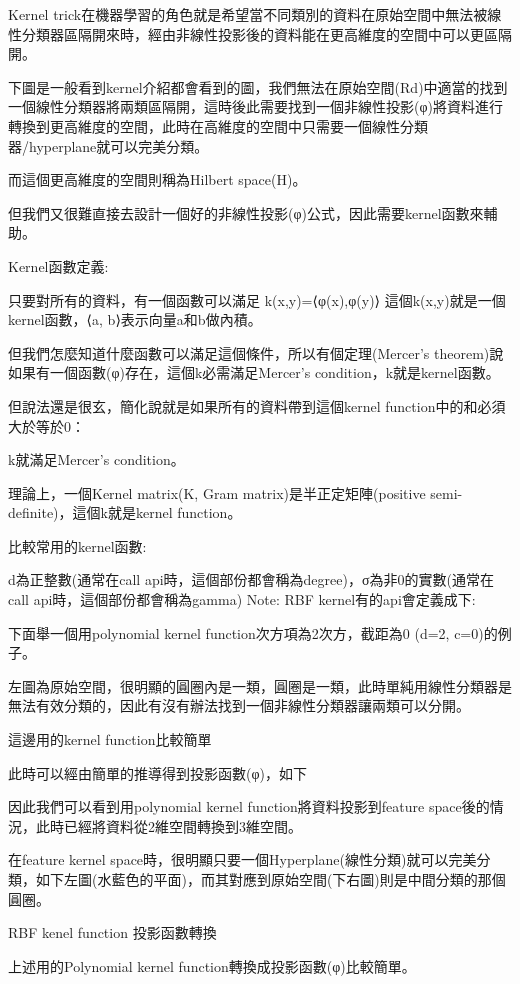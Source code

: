 \documentclass[12pt,a4paper]{amsart}
\begin{document}
Kernel trick在機器學習的角色就是希望當不同類別的資料在原始空間中無法被線性分類器區隔開來時，經由非線性投影後的資料能在更高維度的空間中可以更區隔開。

下圖是一般看到kernel介紹都會看到的圖，我們無法在原始空間(Rd)中適當的找到一個線性分類器將兩類區隔開，這時後此需要找到一個非線性投影(φ)將資料進行轉換到更高維度的空間，此時在高維度的空間中只需要一個線性分類器/hyperplane就可以完美分類。


而這個更高維度的空間則稱為Hilbert space(H)。

但我們又很難直接去設計一個好的非線性投影(φ)公式，因此需要kernel函數來輔助。

Kernel函數定義:

只要對所有的資料，有一個函數可以滿足
k(x,y)=⟨φ(x),φ(y)⟩
這個k(x,y)就是一個kernel函數，⟨a, b⟩表示向量a和b做內積。

但我們怎麼知道什麼函數可以滿足這個條件，所以有個定理(Mercer’s theorem)說如果有一個函數(φ)存在，這個k必需滿足Mercer’s condition，k就是kernel函數。

但說法還是很玄，簡化說就是如果所有的資料帶到這個kernel function中的和必須大於等於0：


k就滿足Mercer’s condition。

理論上，一個Kernel matrix(K, Gram matrix)是半正定矩陣(positive semi-definite)，這個k就是kernel function。


比較常用的kernel函數:


d為正整數(通常在call api時，這個部份都會稱為degree)，σ為非0的實數(通常在call api時，這個部份都會稱為gamma)
Note: RBF kernel有的api會定義成下:


下面舉一個用polynomial kernel function次方項為2次方，截距為0 (d=2, c=0)的例子。

左圖為原始空間，很明顯的圓圈內是一類，圓圈是一類，此時單純用線性分類器是無法有效分類的，因此有沒有辦法找到一個非線性分類器讓兩類可以分開。


這邊用的kernel function比較簡單


此時可以經由簡單的推導得到投影函數(φ)，如下


因此我們可以看到用polynomial kernel function將資料投影到feature space後的情況，此時已經將資料從2維空間轉換到3維空間。


在feature kernel space時，很明顯只要一個Hyperplane(線性分類)就可以完美分類，如下左圖(水藍色的平面)，而其對應到原始空間(下右圖)則是中間分類的那個圓圈。


RBF kenel function 投影函數轉換

上述用的Polynomial kernel function轉換成投影函數(φ)比較簡單。
\end{document}

